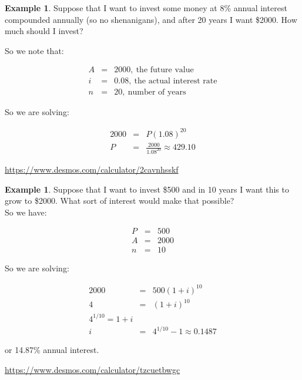 \documentclass[10pt]{article}
\theoremstyle{definition}
\newtheorem{example}[equation]{Example}
\begin{document}
\begin{example}
Suppose that I want to invest some money at 8\% annual interest compounded annually (so no shenanigans), and after 20 years I want \$2000.  How much should I invest?

So we note that:

\begin{eqnarray*}
A&=&2000, \ \text{the future value}\\
i&=&0.08, \ \text{the actual interest rate}\\
n&=&20, \ \text{number of years}
\end{eqnarray*}

So we are solving:

\begin{eqnarray*}
2000&=&P(1.08)^{20}\\
P&=&\frac{2000}{1.08^{20}}\approx429.10
\end{eqnarray*}

\url{https://www.desmos.com/calculator/2cavnhsskf}

\end{example}


\begin{example}
Suppose that I want to invest \$500 and in 10 years I want this to grow to \$2000.  What sort of interest would make that possible?\\

So we have:

\begin{eqnarray*}
P&=&500\\
A&=&2000\\
n&=&10
\end{eqnarray*}

So we are solving:

\begin{eqnarray*}
2000&=&500(1+i)^{10}\\
4&=&(1+i)^{10}\\
4^{1/10}=1+i\\
i&=&4^{1/10}-1\approx0.1487
\end{eqnarray*}

or 14.87\% annual interest.

\url{https://www.desmos.com/calculator/tzcuetbwgc}

\end{example}
\end{document}
